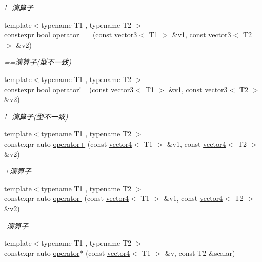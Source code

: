 \begin{DoxyCompactItemize}
\begin{DoxyCompactList}\small\item\em !=演算子 \end{DoxyCompactList}\item 
{\footnotesize template$<$typename T1 , typename T2 $>$ }\\constexpr bool \mbox{\hyperlink{namespacesaki_a5f3eb3ebd6a3ee43771849069101153f}{operator==}} (const \mbox{\hyperlink{classsaki_1_1vector3}{vector3}}$<$ T1 $>$ \&v1, const \mbox{\hyperlink{classsaki_1_1vector3}{vector3}}$<$ T2 $>$ \&v2)
\begin{DoxyCompactList}\small\item\em ==演算子(型不一致) \end{DoxyCompactList}\item 
{\footnotesize template$<$typename T1 , typename T2 $>$ }\\constexpr bool \mbox{\hyperlink{namespacesaki_ae8393ad670f8bb199a92d4287bb1bf3a}{operator!=}} (const \mbox{\hyperlink{classsaki_1_1vector3}{vector3}}$<$ T1 $>$ \&v1, const \mbox{\hyperlink{classsaki_1_1vector3}{vector3}}$<$ T2 $>$ \&v2)
\begin{DoxyCompactList}\small\item\em !=演算子(型不一致) \end{DoxyCompactList}\item 
{\footnotesize template$<$typename T1 , typename T2 $>$ }\\constexpr auto \mbox{\hyperlink{namespacesaki_aba02830a0fe4fd92a264f80bd5f6cd65}{operator+}} (const \mbox{\hyperlink{classsaki_1_1vector4}{vector4}}$<$ T1 $>$ \&v1, const \mbox{\hyperlink{classsaki_1_1vector4}{vector4}}$<$ T2 $>$ \&v2)
\begin{DoxyCompactList}\small\item\em +演算子 \end{DoxyCompactList}\item 
{\footnotesize template$<$typename T1 , typename T2 $>$ }\\constexpr auto \mbox{\hyperlink{namespacesaki_a9b9369c0656bd3b8b940eadf027b41f3}{operator-\/}} (const \mbox{\hyperlink{classsaki_1_1vector4}{vector4}}$<$ T1 $>$ \&v1, const \mbox{\hyperlink{classsaki_1_1vector4}{vector4}}$<$ T2 $>$ \&v2)
\begin{DoxyCompactList}\small\item\em -\/演算子 \end{DoxyCompactList}\item 
{\footnotesize template$<$typename T1 , typename T2 $>$ }\\constexpr auto \mbox{\hyperlink{namespacesaki_a0fe5418c09468a2435c0a8a85a941174}{operator$\ast$}} (const \mbox{\hyperlink{classsaki_1_1vector4}{vector4}}$<$ T1 $>$ \&v, const T2 \&scalar)

\end{DoxyCompactItemize}

